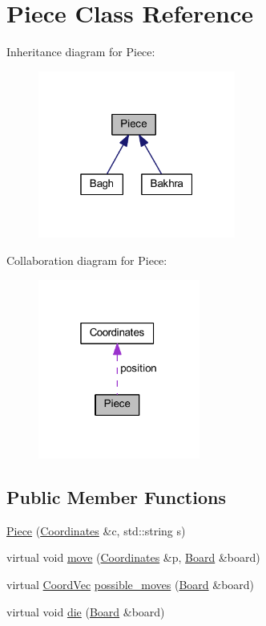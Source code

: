 \hypertarget{class_piece}{}\section{Piece Class Reference}
\label{class_piece}


Inheritance diagram for Piece\+:
\nopagebreak
\begin{figure}[H]
\begin{center}
\leavevmode
\includegraphics[width=184pt]{class_piece__inherit__graph}
\end{center}
\end{figure}


Collaboration diagram for Piece\+:
\nopagebreak
\begin{figure}[H]
\begin{center}
\leavevmode
\includegraphics[width=151pt]{class_piece__coll__graph}
\end{center}
\end{figure}
\subsection*{Public Member Functions}
\begin{DoxyCompactItemize}
\item 
\mbox{\hyperlink{class_piece_a9ef73da286fed76e9cfe158bda2cf565}{Piece}} (\mbox{\hyperlink{class_coordinates}{Coordinates}} \&c, std\+::string s)
\item 
virtual void \mbox{\hyperlink{class_piece_a926422c76f09a9f0df374462ad8d13c1}{move}} (\mbox{\hyperlink{class_coordinates}{Coordinates}} \&p, \mbox{\hyperlink{class_board}{Board}} \&board)
\item 
virtual \mbox{\hyperlink{main_8cpp_a267937870648899c879128d3199195ec}{Coord\+Vec}} \mbox{\hyperlink{class_piece_aaf451c6593a2ed62f8ebe73ba13c0419}{possible\+\_\+moves}} (\mbox{\hyperlink{class_board}{Board}} \&board)
\item 
virtual void \mbox{\hyperlink{class_piece_a2f3261b1482b5635b6aa0bf67c588b98}{die}} (\mbox{\hyperlink{class_board}{Board}} \&board)
\end{DoxyCompactItemize}
